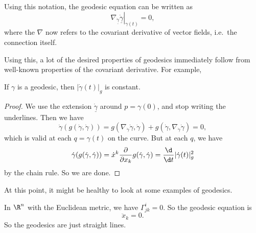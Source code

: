 \documentclass[a4paper]{article}
\begin{document}
Using this notation, the geodesic equation can be written as
\[
  \left.\nabla_{\dot{\underline{\gamma}}} \dot{\underline{\gamma}}\right|_{\gamma(t)} = 0,
\]
where the $\nabla$ now refers to the covariant derivative of vector fields, i.e.\ the connection itself.
\begin{center}
\end{center} %
Using this, a lot of the desired properties of geodesics immediately follow from well-known properties of the covariant derivative. For example,
\begin{prop}
  If $\gamma$ is a geodesic, then $|\dot{\gamma}(t)|_g$ is constant.
\end{prop}

\begin{proof}
  We use the extension $\dot{\underline{\gamma}}$ around $p = \gamma(0)$, and stop writing the underlines. Then we have
  \[
    \dot{\gamma}(g(\dot{\gamma}, \dot{\gamma})) = g(\nabla_{\dot{\gamma}} \dot{\gamma}, \dot{\gamma})+ g(\dot{\gamma}, \nabla_{\dot{\gamma}} \dot{\gamma}) = 0,
  \]
  which is valid at each $q = \gamma(t)$ on the curve. But at each $q$, we have
  \[
    \dot{\gamma}(g(\dot{\gamma}, \dot{\gamma})) = \dot{x}^k \frac{\partial}{\partial x_k} g(\dot{\gamma}, \dot{\gamma}) = \frac{\d}{\d t} |\dot{\gamma}(t)|_g^2
  \]
  by the chain rule. So we are done.
\end{proof}

At this point, it might be healthy to look at some examples of geodesics.
\begin{eg}
  In $\R^n$ with the Euclidean metric, we have $\Gamma^i_{jk} = 0$. So the geodesic equation is
  \[
    \ddot{x}_k = 0.
  \]
  So the geodesics are just straight lines.
\end{eg}
\end{document}
